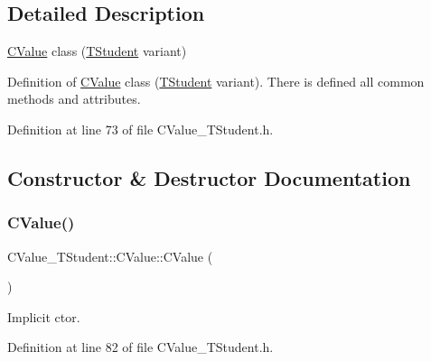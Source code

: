 \subsection{Detailed Description}
\hyperlink{class_c_value___t_student_1_1_c_value}{C\+Value} class ({\ttfamily \hyperlink{struct_c_value___t_student_1_1_t_student}{T\+Student}} variant) 

Definition of \hyperlink{class_c_value___t_student_1_1_c_value}{C\+Value} class ({\ttfamily \hyperlink{struct_c_value___t_student_1_1_t_student}{T\+Student}} variant). There is defined all common methods and attributes. 

Definition at line 73 of file C\+Value\+\_\+\+T\+Student.\+h.



\subsection{Constructor \& Destructor Documentation}
\mbox{\label{class_c_value___t_student_1_1_c_value_ab22934b570a1682fa933b124725230bc}} 
\subsubsection{\texorpdfstring{C\+Value()}{CValue()}\hspace{0.1cm}{\footnotesize\ttfamily [1/4]}}
{\footnotesize\ttfamily C\+Value\+\_\+\+T\+Student\+::\+C\+Value\+::\+C\+Value (\begin{DoxyParamCaption}{ }\end{DoxyParamCaption})\hspace{0.3cm}{\ttfamily [inline]}}



Implicit c\textquotesingle{}tor. 



Definition at line 82 of file C\+Value\+\_\+\+T\+Student.\+h.

\mbox{\label{class_c_value___t_student_1_1_c_value_ae7e9f4452f6d3748cc084a95948b211c}} 
